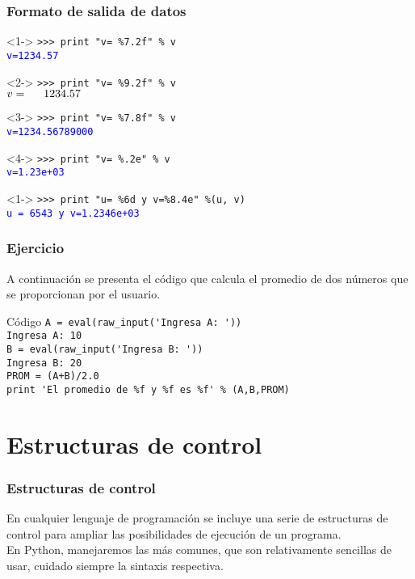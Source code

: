 \documentclass[12pt]{beamer}
\begin{document}
\begin{frame}[fragile]
\frametitle{Formato de salida de datos}
\fontsize{12}{12}\selectfont
\begin{exampleblock}{}<1->
	\verb|>>> print "v= %7.2f" % v| \\
	\pause
	\textcolor{blue}{\texttt{v=1234.57}}
\end{exampleblock}
\begin{exampleblock}{}<2->
	\verb|>>> print "v= %9.2f" % v| \\
	\pause
	\textcolor{blue}{\texttt{$v=\hspace{0.5cm}1234.57$}}
\end{exampleblock}
\begin{exampleblock}{}<3->
	\verb|>>> print "v= %7.8f" % v| \\
	\pause
	\textcolor{blue}{\texttt{v=1234.56789000}}
\end{exampleblock}
\begin{exampleblock}{}<4->
	\verb|>>> print "v= %.2e" % v| \\
	\pause
	\textcolor{blue}{\texttt{v=1.23e+03}}
\end{exampleblock}
\begin{exampleblock}{}<1->
	\verb|>>> print "u= %6d y v=%8.4e" %(u, v)| \\
	\pause
	\textcolor{blue}{\texttt{u = 6543 y v=1.2346e+03}}
\end{exampleblock}
\end{frame}
\begin{frame}[fragile]
\frametitle{Ejercicio}
A continuaci\'{o}n se presenta el c\'{o}digo que calcula el promedio de dos n\'{u}meros que se proporcionan por el usuario.
\begin{exampleblock}{C\'{o}digo}
\fontsize{10}{10}\selectfont
\verb|A = eval(raw_input('Ingresa A: '))| \\
\verb|Ingresa A: 10| \\
\verb|B = eval(raw_input('Ingresa B: '))| \\
\verb|Ingresa B: 20| \\
\verb|PROM = (A+B)/2.0| \\
\verb|print 'El promedio de %f y %f es %f' % (A,B,PROM)|
\end{exampleblock}
\end{frame}
\section{Estructuras de control}
\begin{frame}
\frametitle{Estructuras de control}
En cualquier lenguaje de programaci\'{o}n se incluye una serie de estructuras de control para ampliar las posibilidades de ejecuci\'{o}n de un programa.
\\
\bigskip
En Python, manejaremos las m\'{a}s comunes, que son relativamente sencillas de usar, cuidado siempre la sintaxis respectiva.
\end{frame}
\end{document}
